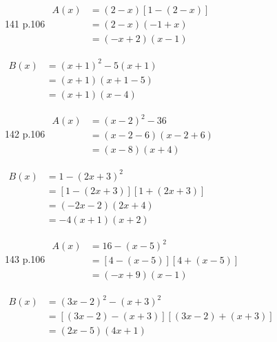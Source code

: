 \documentclass[10pt,a4paper,openany,twoside]{book}
\begin{document}


\begin{bookexo}{141 p.106}
    $\begin{aligned}
        A(x)
        &=(2-x)[1-(2-x)]\\
        &=(2-x)(-1+x)\\
        &=(-x+2)(x-1)
    \end{aligned}$

    $\begin{aligned}
    B(x)
        &=(x+1)^2-5(x+1) \\
        &=(x+1)(x+1-5) \\
        &=(x+1)(x-4)
    \end{aligned}$
\end{bookexo}

\begin{bookexo}{142 p.106}
$\begin{aligned}
    A(x)
        &=(x-2)^2-36 \\
        &=(x-2-6)(x-2+6) \\
        &=(x-8)(x+4)
\end{aligned}$

$\begin{aligned}
    B(x)
        &= 1-(2x+3)^2 \\
        &= [1-(2x+3)][1+(2x+3)] \\
        &= (-2x-2)(2x+4) \\
        &= -4(x+1)(x+2)
\end{aligned}$
\end{bookexo}

\begin{bookexo}{143 p.106}
$\begin{aligned}
    A(x)
        &= 16-(x-5)^2 \\
        &= [4-(x-5)][4+(x-5)] \\
        &= (-x+9)(x-1)
\end{aligned}$

$\begin{aligned}
    B(x)
        &=(3x-2)^2-(x+3)^2 \\
        &=[(3x-2)-(x+3)][(3x-2)+(x+3)] \\
        &= (2x-5)(4x+1)
\end{aligned}$
\end{bookexo}
\end{document}
